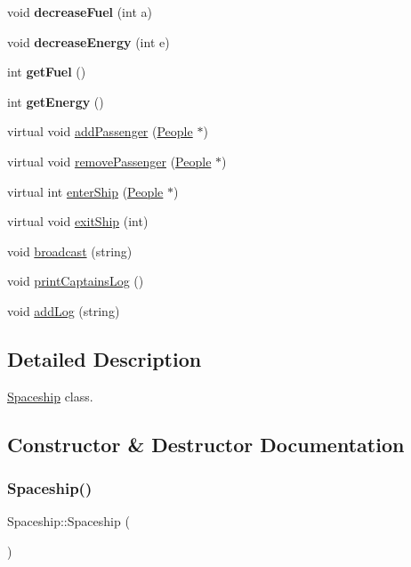 \begin{DoxyCompactItemize}
void {\bfseries decrease\+Fuel} (int a)
\item 
\mbox{\label{classSpaceship_a042c3a5a6dddbfa2db3d411baf3f3f9f}} 
void {\bfseries decrease\+Energy} (int e)
\item 
\mbox{\label{classSpaceship_afa03d65f0166d453527e2eb595426ab5}} 
int {\bfseries get\+Fuel} ()
\item 
\mbox{\label{classSpaceship_ad28625e31d78cc1edb5e248aaf3f01d8}} 
int {\bfseries get\+Energy} ()
\item 
virtual void \hyperlink{classSpaceship_a67b7e60d2dc77e740309a9d994d653a1}{add\+Passenger} (\hyperlink{classPeople}{People} $\ast$)
\item 
virtual void \hyperlink{classSpaceship_ac816c2990b25a1b7c9f6acbc9ca132ee}{remove\+Passenger} (\hyperlink{classPeople}{People} $\ast$)
\item 
virtual int \hyperlink{classSpaceship_a3ed78b14953957576e42c6e741e04690}{enter\+Ship} (\hyperlink{classPeople}{People} $\ast$)
\item 
virtual void \hyperlink{classSpaceship_ae3ddb55d813fa2a3454c1745b23cf6ef}{exit\+Ship} (int)
\item 
void \hyperlink{classSpaceship_a6539b155cc0dc525c506eee788fe9449}{broadcast} (string)
\item 
void \hyperlink{classSpaceship_a949e9815b99d5598da2239e307036141}{print\+Captains\+Log} ()
\item 
void \hyperlink{classSpaceship_acf25a335848231435a64a484c103dfcb}{add\+Log} (string)
\end{DoxyCompactItemize}


\subsection{Detailed Description}
\hyperlink{classSpaceship}{Spaceship} class. 

\subsection{Constructor \& Destructor Documentation}
\mbox{\label{classSpaceship_a13f1c8eb5ded2fb1687203322b22bca9}} 
\subsubsection{\texorpdfstring{Spaceship()}{Spaceship()}\hspace{0.1cm}{\footnotesize\ttfamily [1/2]}}
{\footnotesize\ttfamily Spaceship\+::\+Spaceship (\begin{DoxyParamCaption}{ }\end{DoxyParamCaption})\hspace{0.3cm}{\ttfamily [inline]}}

